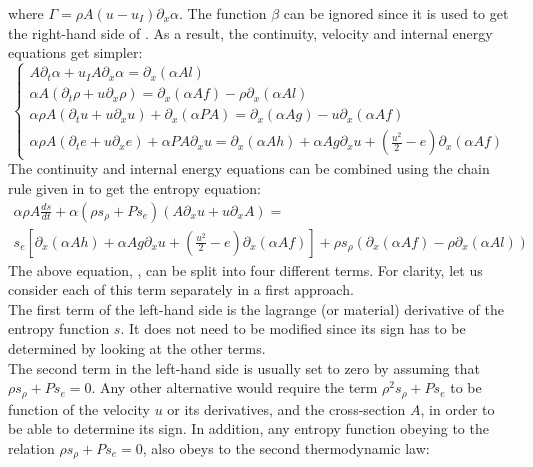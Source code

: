 where $\Gamma=\rho A \left( u - u_I  \right)\partial_x \alpha$. The function $\beta$ can be ignored since it is used to get the right-hand side of  . As a result, the continuity, velocity and internal energy equations get simpler:
\begin{equation}
\label{eq:sev_equ4}
\left\{
\begin{array}{llll}
A \partial_t  \alpha + u_I A \partial_x \alpha =  \partial_x \left( \alpha A l \right)\\
\alpha A \left( \partial_t \rho + u \partial_x  \rho \right) = \partial_x \left( \alpha A f \right) - \rho \partial_x \left( \alpha A l \right) \\
\alpha \rho A \left( \partial_t u + u \partial_x u \right)  + \partial_x \left(\alpha P A \right) =  \partial_x \left( \alpha A g \right) - u \partial_x \left( \alpha A f \right) \\
\alpha \rho A  \left( \partial_t e +u  \partial_x e \right) + \alpha P A \partial_x u = \partial_x \left( \alpha A h \right) + \alpha A g \partial_x u + \left( \frac{u^2}{2}-e \right) \partial_x \left( \alpha A f \right)
\end{array}
\right.
\end{equation}
The continuity and internal energy equations can be combined using the chain rule given in  to get the entropy equation:
\begin{eqnarray}
\label{eq:ent_equ2}
\alpha \rho A \frac{ds}{dt} + \alpha \left( \rho s_{\rho} + Ps_e \right) \left( A \partial_x u + u \partial_x A \right) =  \nonumber \\ 
s_e \left[ \partial_x \left( \alpha A h \right) + \alpha A g \partial_x u + \left( \frac{u^2}{2}-e \right) \partial_x \left( \alpha A f \right) \right] 
+ \rho s_{\rho} \left( \partial_x \left( \alpha A f \right) - \rho \partial_x \left( \alpha A l \right) \right) 
\end{eqnarray}
The above equation, , can be split into four different terms. For clarity, let us consider each of this term separately in a first approach.\\ The first term of the left-hand side is the lagrange (or material) derivative of the entropy function $s$. It does not need to be modified since its sign has to be determined by looking at the other terms. \\The second term in the left-hand side is usually set to zero by assuming that $\rho s_{\rho} +P s_e =0$. Any other alternative would require the term $\rho^2 s_{\rho} +P s_e$ to be function of the velocity $u$ or its derivatives, and the cross-section $A$, in order to be able to determine its sign. In addition, any entropy function obeying to the relation $\rho s_{\rho} +P s_e =0$, also obeys to the second thermodynamic law:
